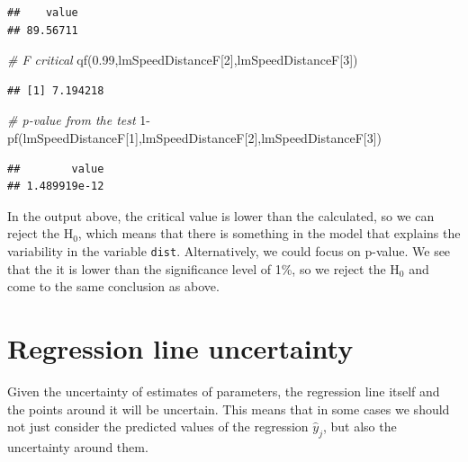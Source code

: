 \documentclass[
]{book}
\newenvironment{Shaded}{\begin{snugshade}}{\end{snugshade}}
\newcommand{\CommentTok}[1]{\textcolor[rgb]{0.56,0.35,0.01}{\textit{#1}}}
\newcommand{\DecValTok}[1]{\textcolor[rgb]{0.00,0.00,0.81}{#1}}
\newcommand{\FloatTok}[1]{\textcolor[rgb]{0.00,0.00,0.81}{#1}}
\newcommand{\FunctionTok}[1]{\textcolor[rgb]{0.00,0.00,0.00}{#1}}
\newcommand{\NormalTok}[1]{#1}
\newcommand{\SpecialCharTok}[1]{\textcolor[rgb]{0.00,0.00,0.00}{#1}}
\theoremstyle{definition}
\theoremstyle{definition}
\theoremstyle{definition}
\theoremstyle{definition}
\theoremstyle{remark}
\begin{document}
\begin{verbatim}
##    value 
## 89.56711
\end{verbatim}

\begin{Shaded}
\begin{Highlighting}[]
\CommentTok{\# F critical}
\FunctionTok{qf}\NormalTok{(}\FloatTok{0.99}\NormalTok{,lmSpeedDistanceF[}\DecValTok{2}\NormalTok{],lmSpeedDistanceF[}\DecValTok{3}\NormalTok{])}
\end{Highlighting}
\end{Shaded}

\begin{verbatim}
## [1] 7.194218
\end{verbatim}

\begin{Shaded}
\begin{Highlighting}[]
\CommentTok{\# p{-}value from the test}
\DecValTok{1}\SpecialCharTok{{-}}\FunctionTok{pf}\NormalTok{(lmSpeedDistanceF[}\DecValTok{1}\NormalTok{],lmSpeedDistanceF[}\DecValTok{2}\NormalTok{],lmSpeedDistanceF[}\DecValTok{3}\NormalTok{])}
\end{Highlighting}
\end{Shaded}

\begin{verbatim}
##        value 
## 1.489919e-12
\end{verbatim}

In the output above, the critical value is lower than the calculated, so we can reject the H\(_0\), which means that there is something in the model that explains the variability in the variable \texttt{dist}. Alternatively, we could focus on p-value. We see that the it is lower than the significance level of 1\%, so we reject the H\(_0\) and come to the same conclusion as above.

\hypertarget{regression-line-uncertainty}{%
\section{Regression line uncertainty}\label{regression-line-uncertainty}}

Given the uncertainty of estimates of parameters, the regression line itself and the points around it will be uncertain. This means that in some cases we should not just consider the predicted values of the regression \(\hat{y}_j\), but also the uncertainty around them.
\end{document}
